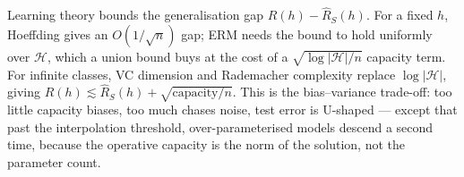 \documentclass[11pt]{article}
\begin{document}
\begin{summarybox}
Learning theory bounds the generalisation gap $R(h)-\widehat R_S(h)$. For a
fixed $h$, Hoeffding gives an $O(1/\sqrt n)$ gap; ERM needs the bound to hold
uniformly over $\mathcal{H}$, which a union bound buys at the cost of a
$\sqrt{\log|\mathcal{H}|/n}$ capacity term. For infinite classes, VC dimension
and Rademacher complexity replace $\log|\mathcal{H}|$, giving
$R(h)\lesssim\widehat R_S(h)+\sqrt{\text{capacity}/n}$. This is the
bias--variance trade-off: too little capacity biases, too much chases noise,
test error is U-shaped --- except that past the interpolation threshold,
over-parameterised models descend a second time, because the operative capacity
is the norm of the solution, not the parameter count.
\end{summarybox}
\end{document}
